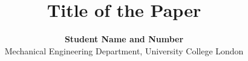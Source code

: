 \documentclass[11pt]{article}
\title{\fontsize{16pt}{19pt}\selectfont\textbf{Title of the Paper}}
\author{\fontsize{14pt}{17pt}\selectfont\textbf{Student Name and Number} \\
\fontsize{12pt}{14pt}\selectfont Mechanical Engineering Department, University College London}
\date{} %
\begin{document}
\maketitle




\setlength{\columnsep}{1.27cm}
\begin{multicols}{2}














\end{multicols}
\end{document}
